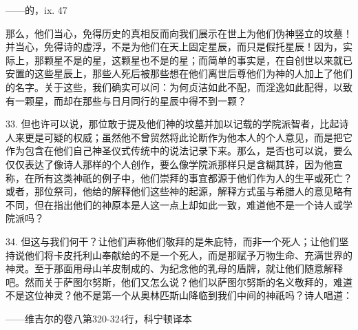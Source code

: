 \newline{}——的，ix. 47\par

那么，他们当心，免得历史的真相反而向我们展示在世上为他们伪神竖立的坟墓！并当心，免得诗的虚浮，不是为他们在天上固定星辰，而只是假托星辰！因为，实际上，那颗星不是的星，这颗星也不是的星；而简单的事实是，在自创世以来就已安置的这些星辰上，那些人死后被那些想在他们离世后尊他们为神的人加上了他们的名字。关于这些，我们确实可以问：为何贞洁如此不配，而淫逸如此配得，以致有一颗星，而却在那些与日月同行的星辰中得不到一颗？\par

33. 但也许可以说，那位敢于提及他们神的坟墓并加以记载的学院派智者，比起诗人来更是可疑的权威；虽然他不曾贸然将此论断作为他本人的个人意见，而是把它作为包含在他们自己神圣仪式传统中的说法记录下来。那么，是否也可以说，要么仅仅表达了像诗人那样的个人创作，要么像学院派那样只是含糊其辞，因为他宣称，在所有这类神祇的例子中，他们崇拜的事宜都源于他们作为人的生平或死亡？或者，那位祭司，他给的解释他们这些神的起源，解释方式虽与希腊人的意见略有不同，但在指出他们的神原本是人这一点上却如此一致，难道他不是一个诗人或学院派吗？\par

34. 但这与我们何干？让他们声称他们敬拜的是朱庇特，而非一个死人；让他们坚持说他们将卡皮托利山奉献给的不是一个死人，而是那赋予万物生命、充满世界的神灵。至于那面用母山羊皮制成的、为纪念他的乳母的盾牌，就让他们随意解释吧。然而关于萨图尔努斯，他们又怎么说？他们以萨图尔努斯的名义敬拜的，难道不是这位神灵？他不是第一个从奥林匹斯山降临到我们中间的神祇吗？诗人唱道：\par

\newline{}——维吉尔的卷八第320-324行，科宁顿译本\par

